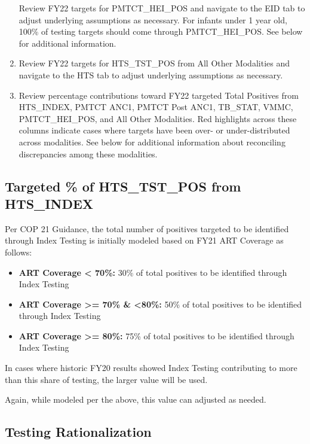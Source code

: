 \documentclass[
  openany]{book}
\begin{document}
\begin{enumerate}
  Review FY22 targets for PMTCT\_HEI\_POS and navigate to the EID tab to
  adjust underlying assumptions as necessary. For infants under 1 year
  old, 100\% of testing targets should come through PMTCT\_HEI\_POS. See
  below for additional information.
\item
  Review FY22 targets for HTS\_TST\_POS from All Other Modalities and
  navigate to the HTS tab to adjust underlying assumptions as
  necessary.
\item
  Review percentage contributions toward FY22 targeted Total Positives
  from HTS\_INDEX, PMTCT ANC1, PMTCT Post ANC1, TB\_STAT, VMMC,
  PMTCT\_HEI\_POS, and All Other Modalities. Red highlights across these
  columns indicate cases where targets have been over- or
  under-distributed across modalities. See below for additional
  information about reconciling discrepancies among these modalities.
\end{enumerate}

\hypertarget{targeted-of-hts_tst_pos-from-hts_index}{%
\subsection{Targeted \% of HTS\_TST\_POS from HTS\_INDEX}\label{targeted-of-hts_tst_pos-from-hts_index}}

Per COP 21 Guidance, the total number of positives targeted to be
identified through Index Testing is initially modeled based on FY21 ART
Coverage as follows:

\begin{itemize}
\item
  \textbf{ART Coverage \textless{} 70\%:} 30\% of total positives to be identified
  through Index Testing
\item
  \textbf{ART Coverage \textgreater= 70\% \& \textless80\%:} 50\% of total positives to be
  identified through Index Testing
\item
  \textbf{ART Coverage \textgreater= 80\%:} 75\% of total positives to be identified
  through Index Testing
\end{itemize}

In cases where historic FY20 results showed Index Testing contributing
to more than this share of testing, the larger value will be used.

Again, while modeled per the above, this value can adjusted as needed.

\hypertarget{testing-rationalization}{%
\subsection{Testing Rationalization}\label{testing-rationalization}}
\end{document}
